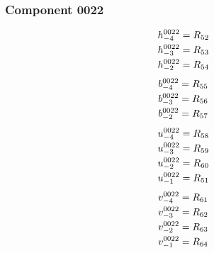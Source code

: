 \documentclass[11pt,a4paper]{article}
\begin{document}
\subsubsection{Component 0022}
\begin{equation}
\shortstack[l]{$\displaystyle h^{0022}_{-4}=R_{52}$\\
$\displaystyle h^{0022}_{-3}=R_{53}$\\
$\displaystyle h^{0022}_{-2}=R_{54}$}
\label{eq:cat-map-14}
\end{equation}
\begin{equation}
\shortstack[l]{$\displaystyle b^{0022}_{-4}=R_{55}$\\
$\displaystyle b^{0022}_{-3}=R_{56}$\\
$\displaystyle b^{0022}_{-2}=R_{57}$}
\label{eq:cat-map-15}
\end{equation}
\begin{equation}
\shortstack[l]{$\displaystyle u^{0022}_{-4}=R_{58}$\\
$\displaystyle u^{0022}_{-3}=R_{59}$\\
$\displaystyle u^{0022}_{-2}=R_{60}$\\
$\displaystyle u^{0022}_{-1}=R_{51}$}
\label{eq:cat-map-16}
\end{equation}
\begin{equation}
\shortstack[l]{$\displaystyle v^{0022}_{-4}=R_{61}$\\
$\displaystyle v^{0022}_{-3}=R_{62}$\\
$\displaystyle v^{0022}_{-2}=R_{63}$\\
$\displaystyle v^{0022}_{-1}=R_{64}$}
\label{eq:cat-map-17}
\end{equation}
\end{document}
